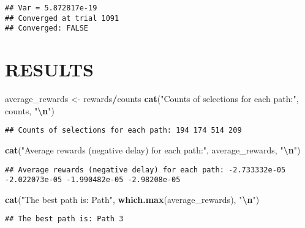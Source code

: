 \documentclass[
]{article}
\newenvironment{Shaded}{\begin{snugshade}}{\end{snugshade}}
\newcommand{\FunctionTok}[1]{\textcolor[rgb]{0.13,0.29,0.53}{\textbf{#1}}}
\newcommand{\NormalTok}[1]{#1}
\newcommand{\OtherTok}[1]{\textcolor[rgb]{0.56,0.35,0.01}{#1}}
\newcommand{\SpecialCharTok}[1]{\textcolor[rgb]{0.81,0.36,0.00}{\textbf{#1}}}
\newcommand{\StringTok}[1]{\textcolor[rgb]{0.31,0.60,0.02}{#1}}
\begin{document}
\begin{verbatim}
## Var = 5.872817e-19 
## Converged at trial 1091 
## Converged: FALSE
\end{verbatim}

\hypertarget{results}{%
\section{RESULTS}\label{results}}

\begin{Shaded}
\begin{Highlighting}[]
\NormalTok{average\_rewards }\OtherTok{\textless{}{-}}\NormalTok{ rewards}\SpecialCharTok{/}\NormalTok{counts}
\FunctionTok{cat}\NormalTok{(}\StringTok{"Counts of selections for each path:"}\NormalTok{, counts, }\StringTok{"}\SpecialCharTok{\textbackslash{}n}\StringTok{"}\NormalTok{)}
\end{Highlighting}
\end{Shaded}

\begin{verbatim}
## Counts of selections for each path: 194 174 514 209
\end{verbatim}

\begin{Shaded}
\begin{Highlighting}[]
\FunctionTok{cat}\NormalTok{(}\StringTok{"Average rewards (negative delay) for each path:"}\NormalTok{, average\_rewards, }\StringTok{"}\SpecialCharTok{\textbackslash{}n}\StringTok{"}\NormalTok{)}
\end{Highlighting}
\end{Shaded}

\begin{verbatim}
## Average rewards (negative delay) for each path: -2.733332e-05 -2.022073e-05 -1.990482e-05 -2.98208e-05
\end{verbatim}

\begin{Shaded}
\begin{Highlighting}[]
\FunctionTok{cat}\NormalTok{(}\StringTok{"The best path is: Path"}\NormalTok{, }\FunctionTok{which.max}\NormalTok{(average\_rewards), }\StringTok{"}\SpecialCharTok{\textbackslash{}n}\StringTok{"}\NormalTok{)}
\end{Highlighting}
\end{Shaded}

\begin{verbatim}
## The best path is: Path 3
\end{verbatim}
\end{document}
